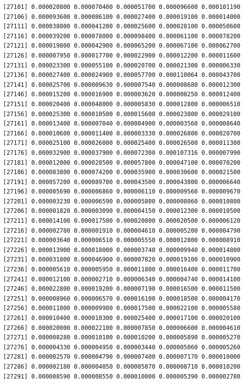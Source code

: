 \documentclass[]{article}
\begin{document}
\begin{verbatim}
[27101] 0.000020800 0.000070400 0.000051700 0.000096600 0.000101190
[27106] 0.000093600 0.000086100 0.000027400 0.000019100 0.000014000
[27111] 0.000038000 0.000041200 0.000025600 0.000028100 0.000050600
[27116] 0.000039200 0.000078000 0.000098400 0.000061100 0.000078200
[27121] 0.000019800 0.000042900 0.000065200 0.000067100 0.000062700
[27126] 0.000007950 0.000017700 0.000022900 0.000012200 0.000011600
[27131] 0.000023300 0.000055100 0.000020700 0.000021300 0.000006330
[27136] 0.000027400 0.000024900 0.000057700 0.000110064 0.000043700
[27141] 0.000025700 0.000009630 0.000007540 0.000008680 0.000012300
[27146] 0.000015200 0.000016900 0.000003620 0.000008250 0.000012400
[27151] 0.000020400 0.000048000 0.000005830 0.000012800 0.000006510
[27156] 0.000025300 0.000010500 0.000015600 0.000023800 0.000029100
[27161] 0.000013400 0.000007040 0.000004900 0.000003560 0.000008640
[27166] 0.000010600 0.000011400 0.000003330 0.000026800 0.000020700
[27171] 0.000025100 0.000026000 0.000025400 0.000026500 0.000011300
[27176] 0.000032900 0.000037900 0.000072300 0.000107316 0.000007990
[27181] 0.000012000 0.000028500 0.000057800 0.000047100 0.000070200
[27186] 0.000083800 0.000074200 0.000035900 0.000030600 0.000021500
[27191] 0.000057200 0.000089700 0.000043500 0.000043800 0.000006640
[27196] 0.000005690 0.000006860 0.000006110 0.000009560 0.000009670
[27201] 0.000003230 0.000006590 0.000005800 0.000008060 0.000010800
[27206] 0.000001820 0.000003090 0.000004150 0.000012300 0.000010500
[27211] 0.000014100 0.000017500 0.000020800 0.000020500 0.000006120
[27216] 0.000002780 0.000001910 0.000004610 0.000005200 0.000004790
[27221] 0.000003640 0.000006510 0.000005550 0.000012800 0.000008910
[27226] 0.000013900 0.000018000 0.000003740 0.000009940 0.000014800
[27231] 0.000031800 0.000046900 0.000007820 0.000019100 0.000010900
[27236] 0.000005610 0.000005950 0.000011800 0.000016400 0.000011700
[27241] 0.000012100 0.000002710 0.000006340 0.000004740 0.000014100
[27246] 0.000022800 0.000019200 0.000007190 0.000016500 0.000011500
[27251] 0.000008960 0.000006570 0.000016100 0.000018500 0.000004170
[27256] 0.000011000 0.000009980 0.000017500 0.000022100 0.000005580
[27261] 0.000010400 0.000010300 0.000025400 0.000017100 0.000020100
[27266] 0.000020000 0.000022100 0.000007850 0.000006600 0.000004610
[27271] 0.000008280 0.000010100 0.000010200 0.000005890 0.000005270
[27276] 0.000004330 0.000004950 0.000003440 0.000005060 0.000005260
[27281] 0.000002570 0.000004790 0.000007400 0.000007170 0.000010000
[27286] 0.000002180 0.000004050 0.000005070 0.000008710 0.000010200
[27291] 0.000008590 0.000008550 0.000010000 0.000005390 0.000002780

\end{verbatim}
\end{document}
